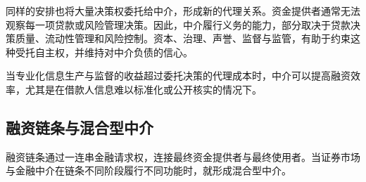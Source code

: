 同样的安排也将大量决策权委托给中介，形成新的代理关系。资金提供者通常无法观察每一项贷款或风险管理决策。因此，中介履行义务的能力，部分取决于贷款决策质量、流动性管理和风险控制。资本、治理、声誉、监督与监管，有助于约束这种受托自主权，并维持对中介负债的信心。

当专业化信息生产与监督的收益超过委托决策的代理成本时，中介可以提高融资效率，尤其是在借款人信息难以标准化或公开核实的情况下。

\subsection{融资链条与混合型中介}

融资链条通过一连串金融请求权，连接最终资金提供者与最终使用者。当证券市场与金融中介在链条不同阶段履行不同功能时，就形成混合型中介。

